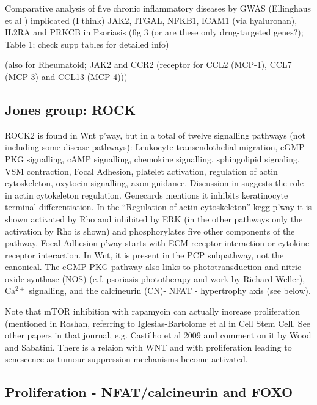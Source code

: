 \documentclass[a4paper,10pt]{report}
\begin{document}
Comparative analysis of five chronic inflammatory diseases by GWAS (Ellinghaus et al \cite{ellinghaus2016analysis})  implicated (I think) JAK2, ITGAL, NFKB1, ICAM1 (via hyaluronan), IL2RA and PRKCB in Psoriasis (fig 3 (or are these only drug-targeted genes?); Table 1; check supp tables for detailed info) 

(also for Rheumatoid; JAK2 and CCR2 (receptor for CCL2 (MCP-1), CCL7 (MCP-3) and CCL13 (MCP-4)))


\subsection{Jones group: ROCK}
ROCK2 is found in Wnt p'way, but in a total of twelve signalling pathways (not including some disease pathways): Leukocyte transendothelial migration, cGMP-PKG signalling, cAMP signalling, chemokine signalling, sphingolipid signaling, VSM contraction, Focal Adhesion, platelet activation, regulation of actin cytoskeleton, oxytocin signalling, axon guidance. Discussion in \cite{roshan2016human} suggests the role in actin cytokeleton regulation. Genecards mentions it inhibits keratinocyte terminal differentiation. In the ``Regulation of actin cytoskeleton'' kegg p'way it is shown activated by Rho and inhibited by ERK (in the other pathways only the activation by Rho is shown) and phosphorylates five other components of the pathway. Focal Adhesion p'way starts with ECM-receptor interaction or cytokine-receptor interaction. In Wnt, it is present in the PCP subpathway, not the canonical. The cGMP-PKG pathway also links to phototransduction and nitric oxide synthase (NOS) (c.f. psoriasis phototherapy and work by Richard Weller), Ca$^{2+}$ signalling, and the calcineurin (CN)- NFAT - hypertrophy axis (see below). 

Note that mTOR inhibition with rapamycin can actually increase proliferation (mentioned in Roshan, referring to Iglesias-Bartolome et al in Cell Stem Cell. See other papers in that journal, e.g. Castilho et al 2009 and comment on it by Wood and Sabatini. There is a relaion with WNT and with proliferation leading to senescence as tumour suppression mechanisms become activated. 

\subsection{Proliferation - NFAT/calcineurin and FOXO}
\end{document}
